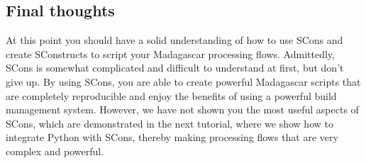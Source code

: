 \subsection{Final thoughts}

At this point you should have a solid understanding of how to use SCons and create SConstructs to script your Madagascar processing flows.  Admittedly, SCons is somewhat complicated and difficult to understand at first, but don't give up.  By using SCons, you are able to create powerful Madagascar scripts that are completely reproducible and enjoy the benefits of using a powerful build management system.  However, we have not shown you the most useful aspects of SCons, which are demonstrated in the next tutorial, where we show how to integrate Python with SCons, thereby making processing flows that are very complex and powerful.
 